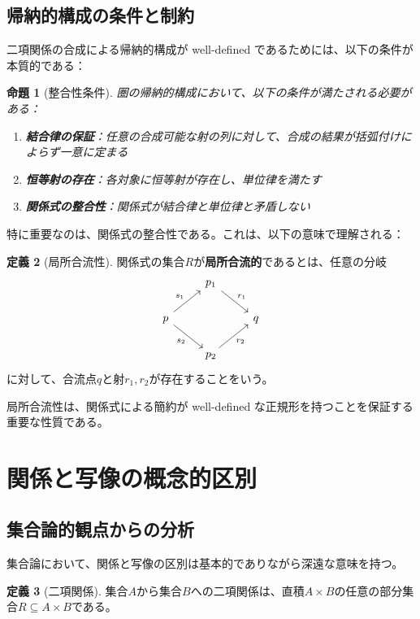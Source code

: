 \documentclass[11pt,a4paper,twocolumn]{ltjsarticle}
\theoremstyle{definition}
\newtheorem{definition}{定義}[section]
\theoremstyle{plain}
\newtheorem{proposition}[definition]{命題}
\begin{document}
\subsection{帰納的構成の条件と制約}

二項関係の合成による帰納的構成が well-defined であるためには、以下の条件が本質的である：

\begin{proposition}[整合性条件]
圏の帰納的構成において、以下の条件が満たされる必要がある：
\begin{enumerate}
\item \textbf{結合律の保証}：任意の合成可能な射の列に対して、合成の結果が括弧付けによらず一意に定まる
\item \textbf{恒等射の存在}：各対象に恒等射が存在し、単位律を満たす
\item \textbf{関係式の整合性}：関係式が結合律と単位律と矛盾しない
\end{enumerate}
\end{proposition}

特に重要なのは、関係式の整合性である。これは、以下の意味で理解される：

\begin{definition}[局所合流性]
関係式の集合$R$が\textbf{局所合流的}であるとは、任意の分岐
\[
\begin{tikzcd}
& p_1 \arrow[dr, "r_1"] & \\
p \arrow[ur, "s_1"] \arrow[dr, "s_2"'] & & q \\
& p_2 \arrow[ur, "r_2"'] &
\end{tikzcd}
\]
に対して、合流点$q$と射$r_1, r_2$が存在することをいう。
\end{definition}

局所合流性は、関係式による簡約が well-defined な正規形を持つことを保証する重要な性質である。

\section{関係と写像の概念的区別}

\subsection{集合論的観点からの分析}

集合論において、関係と写像の区別は基本的でありながら深遠な意味を持つ。

\begin{definition}[二項関係]
集合$A$から集合$B$への二項関係は、直積$A \times B$の任意の部分集合$R \subseteq A \times B$である。
\end{definition}
\end{document}

